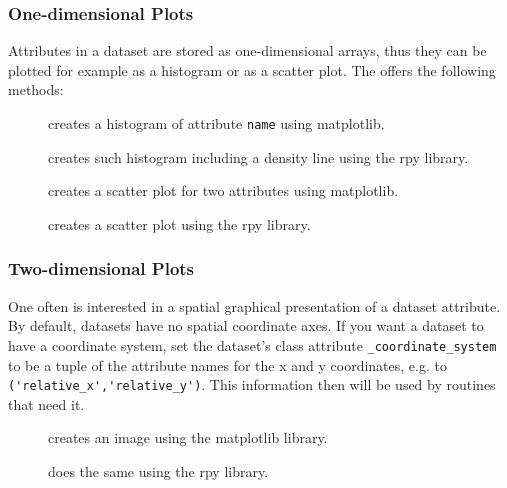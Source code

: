 \subsubsection{One-dimensional Plots}
%
Attributes in a dataset are stored as one-dimensional arrays, thus they can be
plotted for example as a histogram{}
or as a scatter plot{}.
The  offers the following methods:

\begin{description}
\item[] creates a histogram of attribute
\verb|name| using matplotlib.
\item[] creates
such histogram including a density line using the rpy library.
\item[] creates a scatter plot for two
attributes using matplotlib.
\item[] creates a scatter plot
using the rpy library.
\end{description}

\subsubsection{Two-dimensional Plots}
%
One often is interested in a spatial graphical presentation of a dataset
attribute.  By default, datasets have no spatial coordinate axes.  If you want
a dataset to have a coordinate system, set the dataset's class attribute
\verb|_coordinate_system| to be a tuple of the attribute names for the x and y
coordinates, e.g. to \verb|('relative_x','relative_y')|.  This information then
will be used by routines that need it.

\begin{description}
\item[] creates an image using the matplotlib
library.
\item[] does the same using the rpy library.
\end{description}

